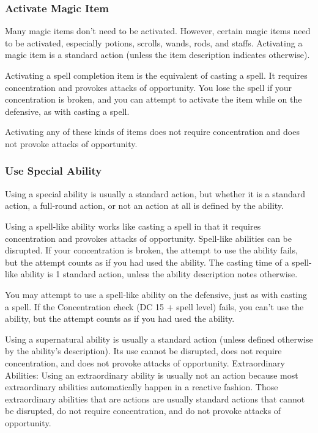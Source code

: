 \subsubsection{Activate Magic Item}

Many magic items don't need to be activated. However, certain magic items need to be activated, especially potions, scrolls, wands, rods, and staffs. Activating a magic item is a standard action (unless the item description indicates otherwise).

Activating a spell completion item is the equivalent of casting a spell. It requires concentration and provokes attacks of opportunity. You lose the spell if your concentration is broken, and you can attempt to activate the item while on the defensive, as with casting a spell.

Activating any of these kinds of items does not require concentration and does not provoke attacks of opportunity.

\subsubsection{Use Special Ability}

Using a special ability is usually a standard action, but whether it is a standard action, a full-round action, or not an action at all is defined by the ability.

Using a spell-like ability works like casting a spell in that it requires concentration and provokes attacks of opportunity. Spell-like abilities can be disrupted. If your concentration is broken, the attempt to use the ability fails, but the attempt counts as if you had used the ability. The casting time of a spell-like ability is 1 standard action, unless the ability description notes otherwise.

You may attempt to use a spell-like ability on the defensive, just as with casting a spell. If the Concentration check (DC 15 + spell level) fails, you can't use the ability, but the attempt counts as if you had used the ability.

Using a supernatural ability is usually a standard action (unless defined otherwise by the ability's description). Its use cannot be disrupted, does not require concentration, and does not provoke attacks of opportunity.
Extraordinary Abilities: Using an extraordinary ability is usually not an action because most extraordinary abilities automatically happen in a reactive fashion. Those extraordinary abilities that are actions are usually standard actions that cannot be disrupted, do not require concentration, and do not provoke attacks of opportunity.

